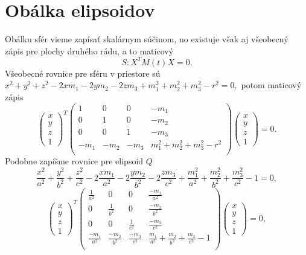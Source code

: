 \section{Obálka elipsoidov}
Obálku sfér vieme zapísať skalárnym súčinom, no existuje však aj všeobecný zápis pre plochy druhého rádu, a to maticový 
$$
S: X^TM(t)X = 0.
$$
Všeobecné rovnice pre sféru v priestore sú
$ x^2 +y^2 +z^2 -2xm_1 -2ym_2 - 2zm_3 + m_1^2 + m_2^2 + m_3^2 - r^2 =0
,$
potom maticový zápis
$$
\left(\begin{matrix} x \\ y \\ z  \\ 1
\end{matrix} \right)^T \left(\begin{matrix} 
1 & 0 & 0 & - m_1 \\
0 & 1 & 0 & - m_2 \\
0 & 0 & 1 & - m_3 \\
- m_1 & - m_2 & - m_3 &  m_1^2 + m_2^2 + m_3^2 - r^2 \\
\end{matrix} \right)\left(\begin{matrix} x \\ y \\ z \\ 1
\end{matrix} \right) = 0. 
$$
Podobne zapíšme rovnice pre elipsoid $Q$
$$ \frac{x^2}{a^2} + \frac{y^2}{b^2} + \frac{z^2}{c^2} - 2 \frac{xm_1}{a^2} - 2 \frac{ym_2}{b^2} - 2 \frac{zm_3}{c^2} + \frac{m_1^2}{a^2} + \frac{m_2^2}{b^2} + \frac{m_3^2}{c^2} - 1 = 0,$$
$$
\left(\begin{matrix} x \\ y \\ z  \\ 1
\end{matrix} \right)^T \left(\begin{matrix} 
\frac{1}{a^2} & 0 & 0 & \frac{-m_1}{a^2} \\
0 & \frac{1}{b^2} & 0 & \frac{-m_2}{b^2} \\
0 & 0 & \frac{1}{c^2} & \frac{-m_3}{c^2} \\
\frac{-m_1}{a^2} & \frac{-m_2}{b^2} & \frac{-m_3}{c^2} & \frac{m_1}{a^2} + \frac{m_2}{b^2} + \frac{m_3}{c^2} - 1 \\
\end{matrix} \right)\left(\begin{matrix} x \\ y \\ z \\ 1
\end{matrix} \right) = 0,
$$
